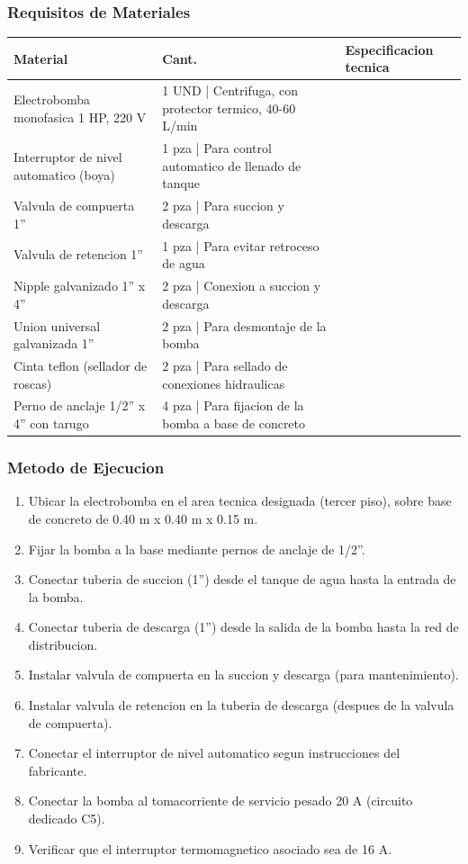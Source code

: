 \subsubsection{Requisitos de Materiales}

\begin{longtable}{L{5.0cm} L{2.0cm} L{7.5cm}}
\toprule
\textbf{Material} & \textbf{Cant.} & \textbf{Especificacion tecnica} \\
\midrule
Electrobomba monofasica 1 HP, 220 V & 1 UND | Centrifuga, con protector termico, 40-60 L/min \\
Interruptor de nivel automatico (boya) & 1 pza | Para control automatico de llenado de tanque \\
Valvula de compuerta 1'' & 2 pza | Para succion y descarga \\
Valvula de retencion 1'' & 1 pza | Para evitar retroceso de agua \\
Nipple galvanizado 1'' x 4'' & 2 pza | Conexion a succion y descarga \\
Union universal galvanizada 1'' & 2 pza | Para desmontaje de la bomba \\
Cinta teflon (sellador de roscas) & 2 pza | Para sellado de conexiones hidraulicas \\
Perno de anclaje 1/2'' x 4'' con tarugo & 4 pza | Para fijacion de la bomba a base de concreto \\
\bottomrule
\end{longtable}

\subsubsection{Metodo de Ejecucion}

\begin{enumerate}
  \item Ubicar la electrobomba en el area tecnica designada (tercer piso), sobre base de concreto de 0.40 m x 0.40 m x 0.15 m.
  \item Fijar la bomba a la base mediante pernos de anclaje de 1/2''.
  \item Conectar tuberia de succion (1'') desde el tanque de agua hasta la entrada de la bomba.
  \item Conectar tuberia de descarga (1'') desde la salida de la bomba hasta la red de distribucion.
  \item Instalar valvula de compuerta en la succion y descarga (para mantenimiento).
  \item Instalar valvula de retencion en la tuberia de descarga (despues de la valvula de compuerta).
  \item Conectar el interruptor de nivel automatico segun instrucciones del fabricante.
  \item Conectar la bomba al tomacorriente de servicio pesado 20 A (circuito dedicado C5).
  \item Verificar que el interruptor termomagnetico asociado sea de 16 A.
\end{enumerate}

